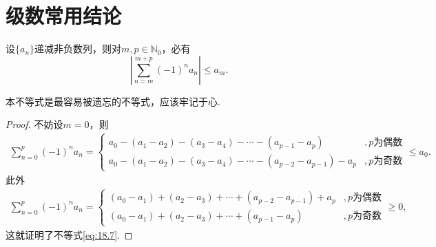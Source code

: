 \documentclass[../../main.tex]{subfiles}
\begin{document}
\section{级数常用结论}

\begin{theorem}[交错级数不等式]\label{theorem:交错级数不等式}
设\(\{a_n\}\)递减非负数列，则对\(m,p\in \mathbb{N}_0\)，必有
\begin{equation}\label{eq:18.7}
\left|\sum_{n = m}^{m + p} (-1)^n a_n\right| \leqslant a_m.
\end{equation}
\end{theorem}
\begin{note}
本不等式是最容易被遗忘的不等式，应该牢记于心.
\end{note}
\begin{proof}
不妨设\(m = 0\)，则
\begin{align*}
\sum_{n = 0}^{p} (-1)^n a_n = 
\begin{cases}
a_0 - (a_1 - a_2) - (a_3 - a_4) - \cdots - (a_{p - 1} - a_p) &, p\text{为偶数} \\
a_0 - (a_1 - a_2) - (a_3 - a_4) - \cdots - (a_{p - 2} - a_{p - 1}) - a_p &, p\text{为奇数}
\end{cases}
\leqslant a_0.
\end{align*}
此外
\begin{align*}
\sum_{n = 0}^{p} (-1)^n a_n = 
\begin{cases}
(a_0 - a_1) + (a_2 - a_3) + \cdots + (a_{p - 2} - a_{p - 1}) + a_p &, p\text{为偶数} \\
(a_0 - a_1) + (a_2 - a_3) + \cdots + (a_{p - 1} - a_p) &, p\text{为奇数}
\end{cases}
\geqslant 0,
\end{align*}
这就证明了不等式\eqref{eq:18.7}.
\end{proof}
\end{document}
